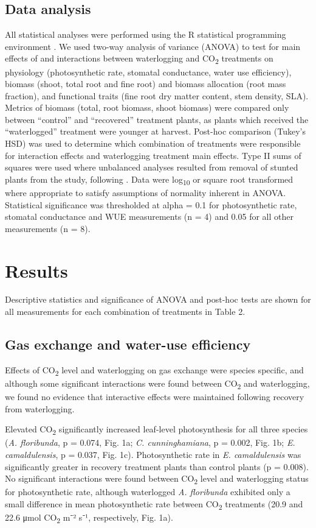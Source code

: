 \documentclass[12pt,a4paper]{memoir}
\begin{document}
\subsection*{Data analysis}
All statistical analyses were performed using the R statistical programming environment  \citep{RCoreTeam2015}. We used two-way analysis of variance (ANOVA) to test for main effects of and interactions between waterlogging and CO\textsubscript{2} treatments on physiology (photosynthetic rate, stomatal conductance, water use efficiency), biomass (shoot, total root and fine root) and biomass allocation (root mass fraction), and functional traits (fine root dry matter content, stem density, SLA). Metrics of biomass (total, root biomass, shoot biomass) were compared only between “control” and “recovered” treatment plants, as plants which received the “waterlogged” treatment were younger at harvest. Post-hoc comparison (Tukey’s HSD) was used to determine which combination of treatments were responsible for interaction effects and waterlogging treatment main effects. Type II sums of squares were used where unbalanced analyses resulted from removal of stunted plants from the study, following \citep{Lansgrud2003}. Data were log\textsubscript{10} or square root transformed where appropriate to satisfy assumptions of normality inherent in ANOVA. Statistical significance was thresholded at alpha = 0.1 for photosynthetic rate, stomatal conductance and WUE measurements (n = 4) and 0.05 for all other measurements (n = 8).

\section{Results}
Descriptive statistics and significance of ANOVA and post-hoc tests are shown for all measurements for each combination of treatments in Table 2. 

\subsection*{Gas exchange and water-use efficiency}
Effects of CO\textsubscript{2} level and waterlogging on gas exchange were species specific, and although some significant interactions were found between CO\textsubscript{2} and waterlogging, we found no evidence that interactive effects were maintained following recovery from waterlogging. 

Elevated CO\textsubscript{2} significantly increased leaf-level photosynthesis for all three species (\textit{A. floribunda}, p = 0.074, Fig. 1a; \textit{C. cunninghamiana}, p = 0.002, Fig. 1b; \textit{E. camaldulensis}, p = 0.037, Fig. 1c). Photosynthetic rate in \textit{E. camaldulensis} was significantly greater in recovery treatment plants than control plants (p = 0.008). No significant interactions were found between CO\textsubscript{2} level and waterlogging status for photosynthetic rate, although waterlogged \textit{A. floribunda} exhibited only a small difference in mean photosynthetic rate between CO\textsubscript{2} treatments (20.9 and 22.6 μmol CO\textsubscript{2} m⁻² s⁻¹, respectively, Fig. 1a).
\end{document}
